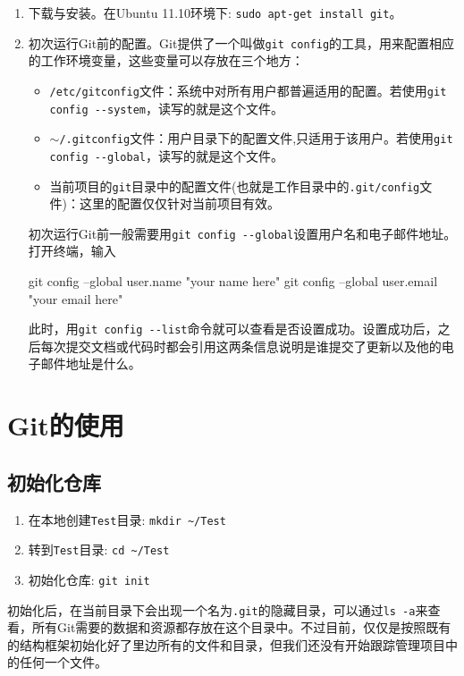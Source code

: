 \documentclass[a4paper,12pt]{article}
\begin{document}
\begin{enumerate}
\item 下载与安装。在Ubuntu 11.10环境下: \lstinline|sudo apt-get install git|。
\item 初次运行Git前的配置。Git提供了一个叫做\lstinline|git config|的工具，用来配置相应的工作环境变量，这些变量可以存放在三个地方\cite{3:misc}：
\begin{itemize}
\item \verb|/etc/gitconfig|文件：系统中对所有用户都普遍适用的配置。若使用\lstinline|git config --system|，读写的就是这个文件。
\item $\sim$\verb|/.gitconfig|文件：用户目录下的配置文件,只适用于该用户。若使用\lstinline|git config --global|，读写的就是这个文件。
\item 当前项目的\verb|git|目录中的配置文件(也就是工作目录中的\verb|.git/config|文件)：这里的配置仅仅针对当前项目有效。
\end{itemize}
初次运行Git前一般需要用\lstinline|git config --global|设置用户名和电子邮件地址\cite{1:misc}。
打开终端，输入
\begin{bash}
git config --global user.name "your name here"
git config --global user.email "your email here"
\end{bash}
此时，用\lstinline|git config --list|命令就可以查看是否设置成功。设置成功后，之后每次提交文档或代码时都会引用这两条信息说明是谁提交了更新以及他的电子邮件地址是什么。
\end{enumerate}

\section{Git的使用}
\label{sec:git}

\subsection{初始化仓库}

\begin{enumerate}
\item 在本地创建\verb|Test|目录: \lstinline|mkdir ~/Test|
\item 转到\verb|Test|目录: \lstinline|cd ~/Test|
\item 初始化仓库: \lstinline|git init|
\end{enumerate}

初始化后，在当前目录下会出现一个名为\verb|.git|的隐藏目录，可以通过\lstinline|ls -a|来查看，所有Git需要的数据和资源都存放在这个目录中。不过目前，仅仅是按照既有的结构框架初始化好了里边所有的文件和目录，但我们还没有开始跟踪管理项目中的任何一个文件\cite{4:misc}。
\end{document}

